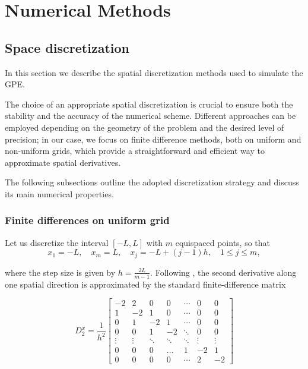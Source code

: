 \chapter{Numerical Methods}

\section{Space discretization}

In this section we describe the spatial discretization methods used to simulate the GPE.

The choice of an appropriate spatial discretization is crucial to ensure both the stability and the accuracy of the numerical scheme. Different approaches can be employed depending on the geometry of the problem and the desired level of precision; in our case, we focus on finite difference methods, both on uniform and non-uniform grids, which provide a straightforward and efficient way to approximate spatial derivatives.

The following subsections outline the adopted discretization strategy and discuss its main numerical properties.

\subsection{Finite differences on uniform grid}

Let us discretize the interval $[-L, L]$ with $m$ equispaced points, so that 
\[
    x_1 = -L, \quad x_m = L, \quad x_j = -L + (j-1)h, \quad 1 \leq j \leq m,
\]

where the step size is given by $h = \tfrac{2L}{m-1}$.  
Following \cite{dispenseCaliari}, the second derivative along one spatial direction is approximated by the standard finite-difference matrix

\[
    D_{2}^x = \frac{1}{h^2}
    \begin{bmatrix}
        -2 & 2  & 0  & 0  & \cdots & 0  & 0 \\
        1 & -2 & 1  & 0  & \cdots & 0  & 0 \\
        0 &  1 & -2 & 1  & \cdots & 0  & 0 \\
        0 &  0 &  1 & -2 & \ddots & 0  & 0 \\
        \vdots & \vdots & \ddots & \ddots & \ddots & \vdots & \vdots \\
        0 &  0 &  0 &  \dots & 1 & -2 & 1 \\
        0 &  0 &  0 &  0 & \cdots &  2 & -2
    \end{bmatrix}
\]

